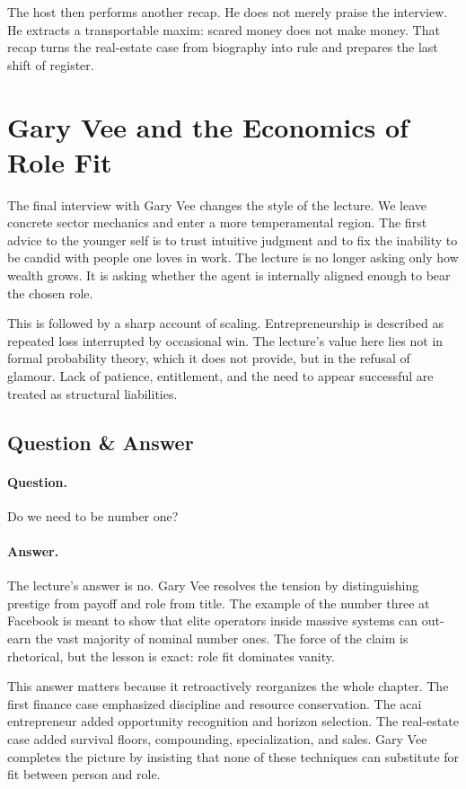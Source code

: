 The host then performs another recap. He does not merely praise the interview. He extracts a transportable maxim: scared money does not make money. That recap turns the real-estate case from biography into rule and prepares the last shift of register.

\section{Gary Vee and the Economics of Role Fit}

The final interview with Gary Vee changes the style of the lecture. We leave concrete sector mechanics and enter a more temperamental region. The first advice to the younger self is to trust intuitive judgment and to fix the inability to be candid with people one loves in work. The lecture is no longer asking only how wealth grows. It is asking whether the agent is internally aligned enough to bear the chosen role.

This is followed by a sharp account of scaling. Entrepreneurship is described as repeated loss interrupted by occasional win. The lecture's value here lies not in formal probability theory, which it does not provide, but in the refusal of glamour. Lack of patience, entitlement, and the need to appear successful are treated as structural liabilities.

\subsection{Question \& Answer}

\paragraph{Question.} Do we need to be number one?

\paragraph{Answer.} The lecture's answer is no. Gary Vee resolves the tension by distinguishing prestige from payoff and role from title. The example of the number three at Facebook is meant to show that elite operators inside massive systems can out-earn the vast majority of nominal number ones. The force of the claim is rhetorical, but the lesson is exact: role fit dominates vanity.

This answer matters because it retroactively reorganizes the whole chapter. The first finance case emphasized discipline and resource conservation. The acai entrepreneur added opportunity recognition and horizon selection. The real-estate case added survival floors, compounding, specialization, and sales. Gary Vee completes the picture by insisting that none of these techniques can substitute for fit between person and role.


